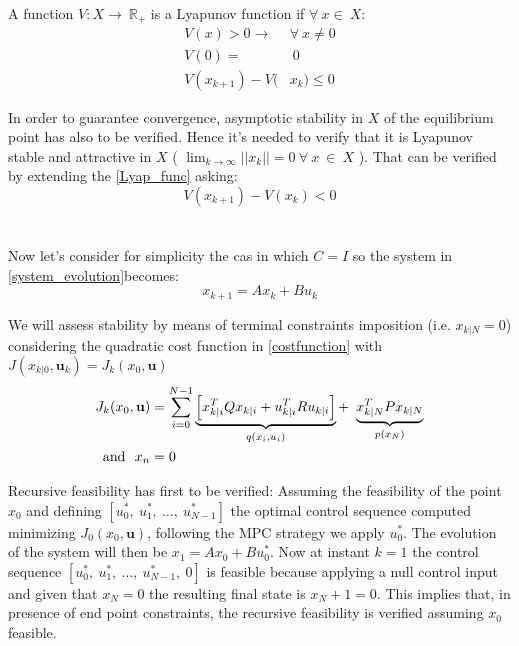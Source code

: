 A function $V:X\rightarrow\ \mathbb{R}_+$ is a Lyapunov function if $\forall\ x \in\ X$:
\begin{equation} \label{Lyap_func}
\begin{split}
	V(x)>0 \rightarrow& \forall\ x \neq 0 \\
	V(0)=&\ 0 \\
	V(x_{k+1})-V(&x_{k}) \leq 0
\end{split}
\end{equation}

In order to guarantee convergence, asymptotic stability in $X$ of the equilibrium point has also to be verified. Hence it's needed to verify that it is Lyapunov stable and attractive in $X$ ( $\lim_{k \to \infty}||x_k||=0\ \forall\ x\ \in\ X$ ). 
That can be verified by extending the \ref{Lyap_func} asking: 
\begin{equation}
	V(x_{k+1})-V(x_{k}) < 0
\end{equation} 
\\ 
\\
Now let's consider for simplicity the cas in which $C=I$ so the system in \ref{system_evolution}becomes:
\begin{equation*}
x_{k+1}=Ax_k+Bu_k
\end{equation*}

We will assess stability by means of terminal constraints imposition (i.e. $x_{k|N}=0$) considering the quadratic cost function in \ref{costfunction} with  $J(x_{k|0},\textbf{u}_k)=J_k(x_0,\textbf{u})$
\begin{equation}
\begin{split}
J_k(x_0,\textbf{u}) &= \sum_{i=0}^{N-1} \underbrace{\left[x_{k|i}^T Q x_{k|i} + u_{k|i}^TRu_{k|i} \right]}_{q(x_i,u_i)} +\ \underbrace{x_{k|N}^T P x_{k|N}}_{p(x_N)} \\
\textnormal{and}\ \  x_n&=0
\end{split}
\end{equation}

Recursive feasibility has first to be verified:
Assuming the feasibility of the point $x_0$ and defining $[u_0^*,\ u_1^*,\ \dots,\ u_{N-1}^*]$ the optimal control sequence computed minimizing $J_0(x_0,\textbf{u})$, following the MPC strategy we apply $u_0^*$. The evolution of the system will then be $x_1=Ax_0+Bu_0^*$.
Now at instant $k=1$ the control sequence $[u_0^*,\ u_1^*,\ \dots,\ u_{N-1}^*,\ 0]$ is feasible because applying a null control input and given that $x_N=0$ the resulting final state is $x_N+1=0$. This implies that, in presence of end point constraints, the recursive feasibility is verified assuming $x_0$ feasible.

